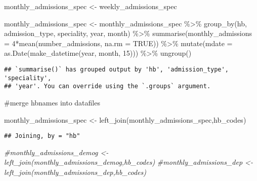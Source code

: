 \documentclass[
]{article}
\newenvironment{Shaded}{\begin{snugshade}}{\end{snugshade}}
\newcommand{\AttributeTok}[1]{\textcolor[rgb]{0.77,0.63,0.00}{#1}}
\newcommand{\CommentTok}[1]{\textcolor[rgb]{0.56,0.35,0.01}{\textit{#1}}}
\newcommand{\ConstantTok}[1]{\textcolor[rgb]{0.00,0.00,0.00}{#1}}
\newcommand{\DecValTok}[1]{\textcolor[rgb]{0.00,0.00,0.81}{#1}}
\newcommand{\FunctionTok}[1]{\textcolor[rgb]{0.00,0.00,0.00}{#1}}
\newcommand{\NormalTok}[1]{#1}
\newcommand{\OtherTok}[1]{\textcolor[rgb]{0.56,0.35,0.01}{#1}}
\newcommand{\SpecialCharTok}[1]{\textcolor[rgb]{0.00,0.00,0.00}{#1}}
\begin{document}
\begin{Shaded}
\begin{Highlighting}[]
\NormalTok{monthly\_admissions\_spec }\OtherTok{\textless{}{-}}\NormalTok{ weekly\_admissions\_spec}

\NormalTok{monthly\_admissions\_spec }\OtherTok{\textless{}{-}}\NormalTok{ monthly\_admissions\_spec }\SpecialCharTok{\%\textgreater{}\%} 
  \FunctionTok{group\_by}\NormalTok{(hb, admission\_type, speciality, year, month) }\SpecialCharTok{\%\textgreater{}\%} 
  \FunctionTok{summarise}\NormalTok{(}\AttributeTok{monthly\_admissions =} \DecValTok{4}\SpecialCharTok{*}\FunctionTok{mean}\NormalTok{(number\_admissions, }\AttributeTok{na.rm =} \ConstantTok{TRUE}\NormalTok{)) }\SpecialCharTok{\%\textgreater{}\%} 
  \FunctionTok{mutate}\NormalTok{(}\AttributeTok{mdate =} \FunctionTok{as.Date}\NormalTok{(}\FunctionTok{make\_datetime}\NormalTok{(year, month, }\DecValTok{15}\NormalTok{))) }\SpecialCharTok{\%\textgreater{}\%} 
  \FunctionTok{ungroup}\NormalTok{()}
\end{Highlighting}
\end{Shaded}

\begin{verbatim}
## `summarise()` has grouped output by 'hb', 'admission_type', 'speciality',
## 'year'. You can override using the `.groups` argument.
\end{verbatim}

\#merge hbnames into datafiles

\begin{Shaded}
\begin{Highlighting}[]
\NormalTok{monthly\_admissions\_spec }\OtherTok{\textless{}{-}} \FunctionTok{left\_join}\NormalTok{(monthly\_admissions\_spec,hb\_codes)}
\end{Highlighting}
\end{Shaded}

\begin{verbatim}
## Joining, by = "hb"
\end{verbatim}

\begin{Shaded}
\begin{Highlighting}[]
\CommentTok{\#monthly\_admissions\_demog \textless{}{-} left\_join(monthly\_admissions\_demog,hb\_codes)}
\CommentTok{\#monthly\_admissions\_dep \textless{}{-} left\_join(monthly\_admissions\_dep,hb\_codes) }
\end{Highlighting}
\end{Shaded}
\end{document}
